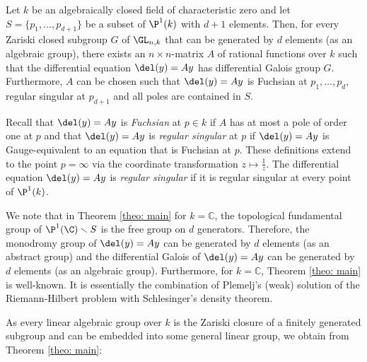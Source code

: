 \documentclass[a4paper, 11pt]{article}
\begin{document}
\begin{theorem} \label{theo: main}
	Let $k$ be an algebraically closed field of characteristic zero and let $S=\{p_1,\ldots,p_{d+1}\}$ be a subset of $\P^1(k)$ with $d+1$ elements. Then, for every Zariski closed subgroup $G$ of $\GL_{n,k}$ that can be generated by $d$ elements (as an algebraic group), there exists an ${n\times n}$-matrix $A$ of rational functions over $k$ such that the differential equation $\del(y)=Ay$ has differential Galois group $G$. Furthermore, $A$ can be chosen such that $\del(y)=Ay$ is Fuchsian at $p_1,\ldots,p_d$, regular singular at $p_{d+1}$ and all poles are contained in $S$.	
\end{theorem}
Recall that $\del(y)=Ay$ is \emph{Fuchsian} at $p\in k$ if $A$ has at most a pole of order one at $p$ and that $\del(y)=Ay$ is \emph{regular singular} at $p$ if $\del(y)=Ay$ is Gauge-equivalent to an equation that is Fuchsian at $p$. %
These definitions extend to the point $p=\infty$ via the coordinate transformation $z\mapsto \frac{1}{z}$. The differential equation $\del(y)=Ay$ is \emph{regular singular} if it is regular singular at every point of $\P^1(k)$.

We note that in Theorem \ref{theo: main} for $k=\mathbb{C}$, the topological fundamental group of $\P^1(\C)\smallsetminus S$ is the free group on $d$ generators. Therefore, the monodromy group of $\del(y)=Ay$ can be generated by $d$ elements (as an abstract group) and the differential Galois of $\del(y)=Ay$ can be generated by $d$ elements (as an algebraic group). Furthermore, for $k=\mathbb{C}$, Theorem \ref{theo: main} is well-known. It is essentially the combination of Plemelj's (weak) solution of the Riemann-Hilbert problem with Schlesinger's density theorem. 

As every linear algebraic group over $k$ is the Zariski closure of a finitely generated subgroup and can be embedded into some general linear group, we obtain from Theorem \ref{theo: main}:
\end{document}

